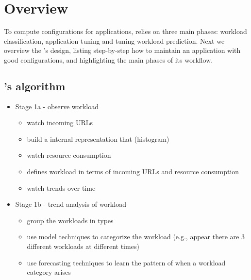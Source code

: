\section{\name Overview}

To compute configurations for applications, \name relies on three main phases:
workload classification, application tuning and tuning-workload prediction. Next
we overview the \name's design, listing step-by-step how to maintain an
application with good configurations, and highlighting the main phases of its
workflow.

\subsection{\name's algorithm}

 \begin{itemize}

   \item Stage 1a - observe workload

     \begin{itemize}

       \item watch incoming URLs

       \item build a internal representation that (histogram)

       \item watch resource consumption

       \item defines workload in terms of incoming URLs and resource consumption

       \item watch trends over time

     \end{itemize}

   \item Stage 1b - trend analysis of workload

     \begin{itemize}

       \item group the workloads in types

       \item use model techniques to categorize the workload (e.g., appear there
         are 3 different workloads at different times)

       \item use forecasting techniques to learn the pattern of when a workload category arises


\end{itemize}
\end{itemize}
